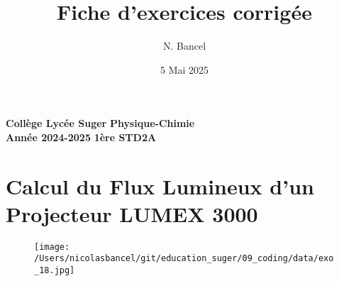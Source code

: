 \documentclass[answers]{exam}
\title{Fiche d'exercices corrigée}
\author{N. Bancel}
\date{5 Mai 2025}
\begin{document}
\textbf{Collège Lycée Suger}
\hfill
\textbf{Physique-Chimie} \\

\textbf{Année 2024-2025}
\hfill
\textbf{1ère STD2A} \par

{\let\newpage\relax\maketitle}




\section*{Calcul du Flux Lumineux d'un Projecteur LUMEX 3000}

    \begin{figure}[H]
      \centering
      \texttt{[image: /Users/nicolasbancel/git/education\_suger/09\_coding/data/exo\_18.jpg]}
      \captionsetup{labelformat=empty}
    \end{figure}
\end{document}
